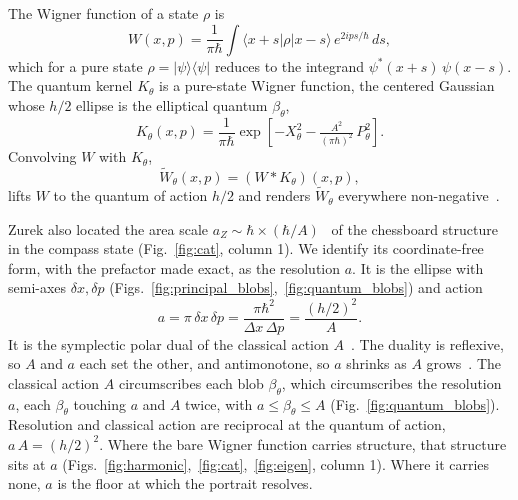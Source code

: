 \documentclass[aps,prl,reprint,amsmath,amssymb,floatfix,nofootinbib]{revtex4-2}
\begin{document}
The Wigner function of a state $\rho$ is
\begin{equation}
W(x,p) = \frac{1}{\pi\hbar}\int \langle x+s|\rho|x-s\rangle\,e^{2ips/\hbar}\,ds,
\label{eq:wigner}
\end{equation}
which for a pure state $\rho = |\psi\rangle\langle\psi|$ reduces to the integrand $\psi^*(x+s)\,\psi(x-s)$. The quantum kernel $K_\theta$ is a pure-state Wigner function, the centered Gaussian whose $h/2$ ellipse is the elliptical quantum $\beta_\theta$,
\begin{equation}
K_\theta(x, p) = \frac{1}{\pi\hbar}\exp\!\left[ -X_\theta^{2} - \tfrac{A^2}{(\pi\hbar)^2}\, P_\theta^{2} \right].
\label{eq:Ktheta}
\end{equation}
Convolving $W$ with $K_\theta$,
\begin{equation}
\widetilde W_\theta(x,p) = (W * K_\theta)(x,p),
\label{eq:Wtheta}
\end{equation}
lifts $W$ to the quantum of action $h/2$ and renders $\widetilde W_\theta$ everywhere non-negative~\cite{cartwright1976,degosson2005bullsci,cordero2018}.

Zurek also located the area scale $a_Z \sim \hbar \times (\hbar / A)$~\cite{zurek2001,zurek2003decoherence} of the chessboard structure in the compass state (Fig.~\ref{fig:cat}, column 1). We identify its coordinate-free form, with the prefactor made exact, as the resolution $a$. It is the ellipse with semi-axes $\delta x, \delta p$ (Figs.~\ref{fig:principal_blobs},~\ref{fig:quantum_blobs}) and action
\begin{equation}
a = \pi\,\delta x\,\delta p = \frac{\pi\hbar^2}{\Delta x\,\Delta p} = \frac{(h/2)^2}{A}.
\label{eq:tildea}
\end{equation}
It is the symplectic polar dual of the classical action $A$~\cite{degosson2015indeterminacy}. The duality is reflexive, so $A$ and $a$ each set the other, and antimonotone, so $a$ shrinks as $A$ grows~\cite{degosson2022polar}. The classical action $A$ circumscribes each blob $\beta_\theta$, which circumscribes the resolution $a$, each $\beta_\theta$ touching $a$ and $A$ twice, with $a \le \beta_\theta \le A$ (Fig.~\ref{fig:quantum_blobs}). Resolution and classical action are reciprocal at the quantum of action, $a\,A = (h/2)^2$. Where the bare Wigner function carries structure, that structure sits at $a$ (Figs.~\ref{fig:harmonic},~\ref{fig:cat},~\ref{fig:eigen}, column 1). Where it carries none, $a$ is the floor at which the portrait resolves.
\end{document}
